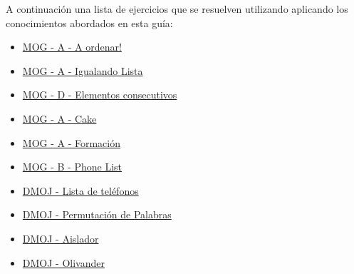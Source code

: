 A continuación una lista de ejercicios que se resuelven utilizando aplicando los conocimientos abordados en esta guía:

\begin{itemize}
	\item \href{https://matcomgrader.com/problem/8084/a-ordenar/} {MOG - A - A ordenar!}
	\item \href{https://matcomgrader.com/problem/9203/igualando-lista/} {MOG - A - Igualando Lista}
	\item \href{https://matcomgrader.com/problem/9203/igualando-lista/} {MOG - D - Elementos consecutivos}
	\item \href{https://matcomgrader.com/problem/9145/cake/} {MOG - A - Cake}
	\item \href{https://matcomgrader.com/problem/51/formacion/} {MOG - A - Formación}
	\item \href{https://matcomgrader.com/problem/210/phone-list/}{MOG - B - Phone List}
	\item \href{https://dmoj.uclv.edu.cu/problem/phone}{DMOJ - Lista de teléfonos}
	\item \href{https://dmoj.uclv.edu.cu/problem/wordpermutation}{DMOJ - Permutación de Palabras}
	\item \href{https://dmoj.uclv.edu.cu/problem/aisalador}{DMOJ - Aislador}
	\item \href{https://dmoj.uclv.edu.cu/problem/2019t1a}{DMOJ - Olivander}
\end{itemize}